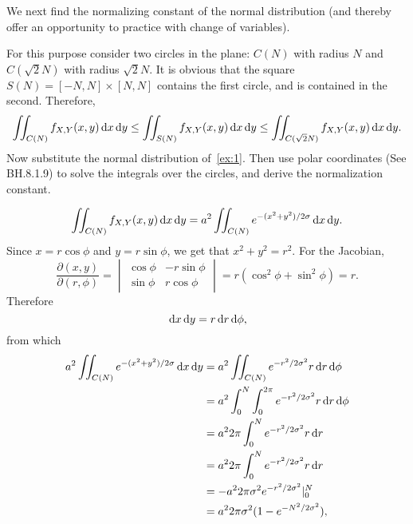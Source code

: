 We next find the normalizing constant of the normal distribution (and thereby offer an opportunity to practice with change of variables).

\begin{exercise}
For this purpose consider two circles in the plane: $C(N)$ with radius $N$ and $C(\sqrt 2 N)$ with radius $\sqrt 2 N$.
It is obvious that the square $S(N) = [-N,N]\times[N,N]$ contains the first circle, and is contained in the second.
Therefore,
\begin{equation}
  \label{eq:13}
  \iint_{C(N)}f_{X,Y}(x,y) \,\textrm{d}x\,\textrm{d}y \leq
  \iint_{S(N)}f_{X,Y}(x,y) \,\textrm{d}x\,\textrm{d}y \leq
  \iint_{C(\sqrt 2 N)}f_{X,Y}(x,y) \,\textrm{d}x\,\textrm{d}y.
\end{equation}
Now substitute the normal distribution of~\cref{ex:1}.
Then use polar coordinates (See BH.8.1.9) to solve the integrals over the circles, and derive the normalization constant.
\begin{solution}
\begin{equation}
\label{eq:14}
  \iint_{C(N)}f_{X,Y}(x,y) \,\textrm{d}x\,\textrm{d}y =
a^{2}  \iint_{C(N)} e^{-(x^{2}+y^{2})/2\sigma} \,\textrm{d}x\,\textrm{d}y.
\end{equation}
Since  $x = r \cos \phi$ and $y=r\sin \phi$, we get that $x^2+y^2 = r^{2}$. For the Jacobian,
\begin{equation}
  \label{eq:15}
  \frac{\partial(x, y)}{\partial(r,\phi)} =
  \begin{vmatrix}
    \cos \phi  & -r\sin \phi \\
    \sin \phi  & r\cos \phi
  \end{vmatrix}
= r(\cos^{2} \phi + \sin^2 \phi) = r.
\end{equation}
Therefore
\begin{equation}
\label{eq:16}
\,\textrm{d}x \,\textrm{d}y = r \,\textrm{d}r \,\textrm{d}\phi,
\end{equation}
from which
\begin{align}
a^{2}  \iint_{C(N)} e^{-(x^{2}+y^{2})/2\sigma} \,\textrm{d}x\,\textrm{d}y
&=a^{2}  \iint_{C(N)} e^{-r^{2}/2\sigma^{2}} r \,\textrm{d}r\,\textrm{d}\phi \\
&= a^{2}  \int_{0}^{N} \int_{0}^{2\pi} e^{-r^{2}/2\sigma^{2}} r \,\textrm{d}r\,\textrm{d}\phi \\
&= a^{2}  2\pi \int_{0}^{N}  e^{-r^{2}/2\sigma^{2}} r \,\textrm{d}r \\
&= a^{2}  2\pi \int_{0}^{N}  e^{-r^{2}/2\sigma^{2}} r \,\textrm{d}r \\
&= - a^{2}  2\pi{\sigma^{2}} e^{-r^{2}/2\sigma^{2}}|_{0}^{N} \\
&= a^{2}2\pi{\sigma^{2}} (1-e^{-N^{2}/2\sigma^{2}}),
\end{align}

\end{solution}
\end{exercise}
